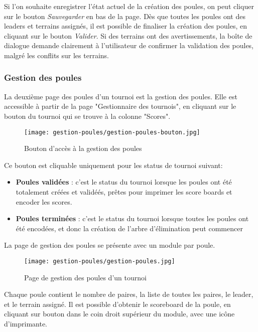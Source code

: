 Si l'on souhaite enregistrer l'état actuel de la création des poules, on peut cliquer sur le bouton \textit{Sauvegarder} en bas de la page. Dès que toutes les poules ont des leaders et terrains assignés, il est possible de finaliser la création des poules, en cliquant sur le bouton \textit{Valider}. Si des terrains ont des avertissements, la boîte de dialogue demande clairement à l'utilisateur de confirmer la validation des poules, malgré les conflits sur les terrains.

\subsubsection{Gestion des poules}

La deuxième page des poules d'un tournoi est la gestion des poules. Elle est accessible à partir de la page "Gestionnaire des tournois", en cliquant sur le bouton du tournoi qui se trouve à la colonne "Scores".

\begin{figure}[H]
\centering
\texttt{[image: gestion-poules/gestion-poules-bouton.jpg]}
\caption{Bouton d'accès à la gestion des poules}
\end{figure}

Ce bouton est cliquable uniquement pour les status de tournoi suivant:

\begin{itemize}
\item \textbf{Poules validées} : c'est le status du tournoi lorsque les poules ont été totalement créées et validéés, prêtes pour imprimer les score boards et encoder les scores.
\item \textbf{Poules terminées} : c'est le status du tournoi lorsque toutes les poules ont été encodées, et donc la création de l'arbre d'élimination peut commencer
\end{itemize}

La page de gestion des poules se présente avec un module par poule.

\begin{figure}[H]
\centering
\texttt{[image: gestion-poules/gestion-poules.jpg]}
\caption{Page de gestion des poules d'un tournoi}
\end{figure}

Chaque poule contient le nombre de paires, la liste de toutes les paires, le leader, et le terrain assigné. Il est possible d'obtenir le scoreboard de la poule, en cliquant sur bouton dans le coin droit supérieur du module, avec une icône d'imprimante.

